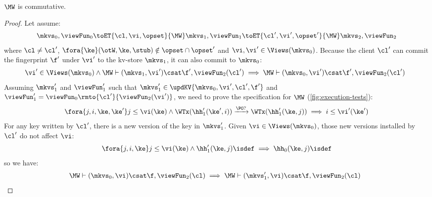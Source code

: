 \begin{lemma}
    \label{lem:mw-comm}
    \(\MW\) is commutative.
\end{lemma}
\begin{proof}
    Let assume:
    \[
        \mkvs_0, \viewFun_0 \toET{\cl, \vi, \opset}{\MW} \mkvs_1, \viewFun_1 \toET{\cl', \vi', \opset'}{\MW} \mkvs_2, \viewFun_2 
    \]
    where \( \cl \neq \cl' \), \( \fora{ \ke } (\otW, \ke, \stub) \notin \opset \cap \opset' \) and \( \vi, \vi' \in \Views(\mkvs_0)\).
    Because the client \( \cl' \) can commit the fingerprint \( \f' \) under \( \vi' \) to the kv-store \( \mkvs_1 \), it can also commit to \( \mkvs_0 \):
    \[
        \begin{array}{@{}l}
            \vi' \in \Views(\mkvs_0) \land \MW \vdash (\mkvs_1, \vi') \csat \f', \viewFun_2(\cl') \implies  \MW \vdash (\mkvs_0, \vi') \csat \f', \viewFun_2(\cl')
        \end{array}
    \]
    Assuming \( \mkvs'_1 \) and \( \viewFun'_1 \) such that \( \mkvs'_1 \in \updKV{\mkvs_0,\vi',\cl',\f'} \) and \( \viewFun'_1 = \viewFun_0\rmto{\cl'}{\viewFun_2(\vi')} \), we need to prove the specification for \( \MW \) (\cref{fig:execution-tests}):
    \[
        \fora{j,i, \ke, \ke'} j \leq \vi(\ke) \wedge \WTx(\hh'_1(\ke', i)) \xrightarrow{\PO ?} \WTx(\hh'_1(\ke, j)) \implies i \leq \vi'(\ke')  \\
    \]
    For any key written by \( \cl' \), there is a new version of the key in \( \mkvs'_1 \).
    Given \( \vi \in \Views(\mkvs_0)\), those new versions installed by \( \cl' \) do not affect \( \vi \):
    \[
        \fora{j,i, \ke} j \leq \vi(\ke) \land \hh'_1(\ke, j)\isdef \implies \hh_0(\ke, j)\isdef
    \]
    so we have:
    \[
        \begin{array}{@{}l}
            \MW \vdash (\mkvs_0, \vi) \csat \f, \viewFun_2(\cl) \implies  \MW \vdash (\mkvs'_1, \vi) \csat \f, \viewFun_2(\cl)
        \end{array}
    \]
\end{proof}


